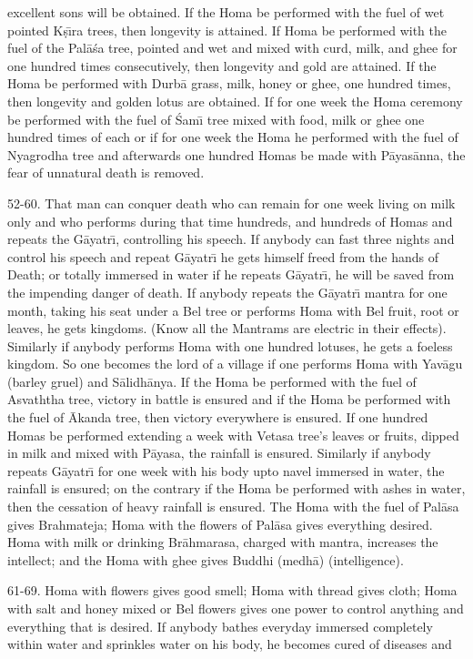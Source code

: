 excellent sons will be obtained. If the Homa be performed with the fuel of wet pointed K\d{s}\={\i}ra trees, then longevity is attained. If Homa be performed with the fuel of the Pal\=a\'sa tree, pointed and wet and mixed with curd, milk, and ghee for one hundred times consecutively, then longevity and gold are attained. If the Homa be performed with Durb\=a grass, milk, honey or ghee, one hundred times, then longevity and golden lotus are obtained. If for one week the Homa ceremony be performed with the fuel of \'Sam\={\i} tree mixed with food, milk or ghee one hundred times of each or if for one week the Homa he performed with the fuel of Nyagrodha tree and afterwards one hundred Homas be made with P\=ayas\=anna, the fear of unnatural death is removed.

52-60. That man can conquer death who can remain for one week living on milk only and who performs during that time hundreds, and hundreds of Homas and repeats the G\=ayatr\={\i}, controlling his speech. If anybody can fast three nights and control his speech and repeat G\=ayatr\={\i} he gets himself freed from the hands of Death; or totally immersed in water if he repeats G\=ayatr\={\i}, he will be saved from the impending danger of death. If anybody repeats the G\=ayatr\={\i} mantra for one month, taking his seat under a Bel tree or performs Homa with Bel fruit, root or leaves, he gets kingdoms. (Know all the Mantrams are electric in their effects). Similarly if anybody performs Homa with one hundred lotuses, he gets a foeless kingdom. So one becomes the lord of a village if one performs Homa with Yav\=agu (barley gruel) and S\=alidh\=anya. If the Homa be performed with the fuel of Asvaththa tree, victory in battle is ensured and if the Homa be performed with the fuel of \=Akanda tree, then victory everywhere is ensured. If one hundred Homas be performed extending a week with Vetasa tree's leaves or fruits, dipped in milk and mixed with P\=ayasa, the rainfall is ensured. Similarly if anybody repeats G\=ayatr\={\i} for one week with his body upto navel immersed in water, the rainfall is ensured; on the contrary if the Homa be performed with ashes in water, then the cessation of heavy rainfall is ensured. The Homa with the fuel of Pal\=asa gives Brahmateja; Homa with the flowers of Pal\=asa gives everything desired. Homa with milk or drinking Br\=ahmarasa, charged with mantra, increases the intellect; and the Homa with ghee gives Buddhi (medh\=a) (intelligence).

61-69. Homa with flowers gives good smell; Homa with thread gives cloth; Homa with salt and honey mixed or Bel flowers gives one power to control anything and everything that is desired. If anybody bathes everyday immersed completely within water and sprinkles water on his body, he becomes cured of diseases and

